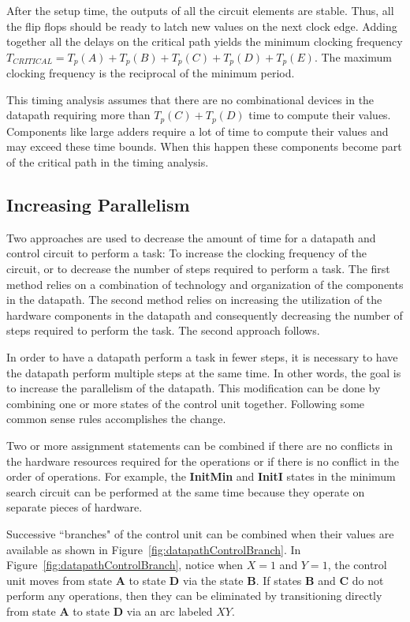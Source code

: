 After the setup time, the outputs of all the circuit elements
are stable.  Thus, all the flip flops should be ready to latch new
values on the next clock edge.  Adding together all the
delays on the critical path yields the minimum clocking frequency
$T_{CRITICAL}=T_p(A)+T_p(B)+T_p(C)+T_p(D)+T_p(E)$. The maximum
clocking frequency is the reciprocal of the minimum period.

This timing analysis assumes that there are no combinational devices in
the datapath requiring more than $T_p(C)+T_p(D)$ time to compute their
values.  Components like large adders require a lot of time to compute
their values and may exceed these time bounds.  When this happen these
components become part of the critical path in the timing analysis.

\subsection{Increasing Parallelism}

Two approaches are used to decrease the amount of time for a
datapath and control circuit to perform a task: To increase
the clocking frequency of the circuit, or to decrease the number of
steps required to perform a task.  The first method relies on a
combination of technology and organization of the components in
the datapath.  The second method relies on increasing the utilization
of the hardware components in the datapath and consequently decreasing
the number of steps required to perform the task.
The second approach follows.

In order to have a datapath perform a task in fewer steps, it is
necessary to have the datapath perform multiple steps at the
same time.  In other words, the goal is to increase the
parallelism of the datapath.  This modification can be done by combining
one or more states of the control unit together.
Following some common sense rules accomplishes the change.

Two or more assignment statements can be combined if there are
no conflicts in the hardware resources required for the operations
or if there is no conflict in the order of operations.
For example, the \textbf{ InitMin} and \textbf{ InitI} states in the
minimum search circuit can be performed at the same time because
they operate on separate pieces of hardware.

Successive ``branches" of the control unit can be combined when
their values are available as shown in Figure~\ref{fig:datapathControlBranch}.
In Figure~\ref{fig:datapathControlBranch}, notice when $X=1$ and $Y=1$,
the control unit moves from state \textbf{ A} to state \textbf{ D} via the
state \textbf{ B}.  If states \textbf{ B} and \textbf{ C} do not perform any
operations, then they can be eliminated by transitioning directly
from state \textbf{ A} to state \textbf{ D} via an arc labeled $XY$.

